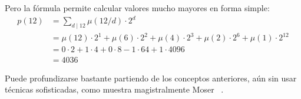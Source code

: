   Pero la fórmula permite calcular valores mucho mayores
  en forma simple:
  \begin{align*}
    p(12)
      &= \sum_{d \mid 12} \mu(12 / d) \cdot 2^d \\
      &= \mu(12) \cdot 2^1
	   + \mu(6) \cdot 2^2
	   + \mu(4) \cdot 2^3
	   + \mu(2) \cdot 2^6
	   + \mu(1) \cdot 2^{12} \\
      &= 0 \cdot 2
	   + 1 \cdot 4
	   + 0 \cdot 8
	   - 1 \cdot 64
	   + 1 \cdot 4096 \\
      &= 4036
  \end{align*}

  Puede profundizarse bastante
  partiendo de los conceptos anteriores,
  aún sin usar técnicas sofisticadas,
  como muestra magistralmente Moser~%
    \cite{moser04:_introd_theor_number}.

